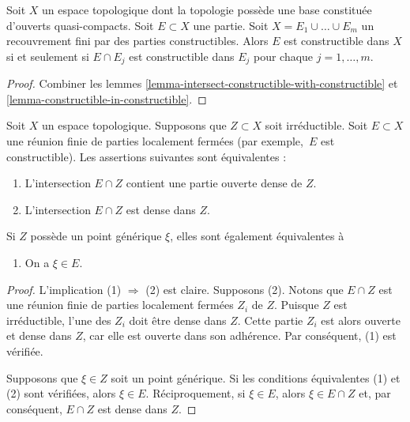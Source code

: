 \begin{lemma}
\label{lemma-collate-constructible-from-constructible}
Soit $X$ un espace topologique dont la topologie possède une base
constituée d'ouverts quasi-compacts. Soit $E \subset X$ une partie.
Soit $X = E_1 \cup \ldots \cup E_m$ un recouvrement fini par des parties
constructibles. Alors $E$ est constructible dans $X$ si et seulement si $E \cap E_j$
est constructible dans $E_j$ pour chaque $j = 1, \ldots, m$.
\end{lemma}

\begin{proof}
Combiner les
lemmes \ref{lemma-intersect-constructible-with-constructible} et
\ref{lemma-constructible-in-constructible}.
\end{proof}

\begin{lemma}
\label{lemma-generic-point-in-constructible}
Soit $X$ un espace topologique. Supposons que
$Z \subset X$ soit irréductible. Soit $E \subset X$
une réunion finie de parties localement fermées (par exemple,\ $E$
est constructible). Les assertions suivantes sont équivalentes :
\begin{enumerate}
\item L'intersection $E \cap Z$ contient une partie ouverte
dense de $Z$.
\item L'intersection $E \cap Z$ est dense dans $Z$.
\end{enumerate}
Si $Z$ possède un point générique $\xi$, elles sont
également équivalentes à
\begin{enumerate}
\item[(3)] On a $\xi \in E$.
\end{enumerate}
\end{lemma}

\begin{proof}
L'implication (1) $\Rightarrow$ (2) est claire. Supposons (2).
Notons que $E \cap Z$ est une réunion finie de parties localement fermées
$Z_i$ de $Z$. Puisque $Z$ est irréductible, l'une des $Z_i$ doit
être dense dans $Z$. Cette partie $Z_i$ est alors ouverte et dense dans $Z$, car elle est
ouverte dans son adhérence. Par conséquent, (1) est vérifiée.

\medskip\noindent
Supposons que $\xi \in Z$ soit un point générique. Si les conditions équivalentes
(1) et (2) sont vérifiées, alors $\xi \in E$. Réciproquement, si $\xi \in E$, alors
$\xi \in E \cap Z$ et, par conséquent, $E \cap Z$ est dense dans $Z$.
\end{proof}







